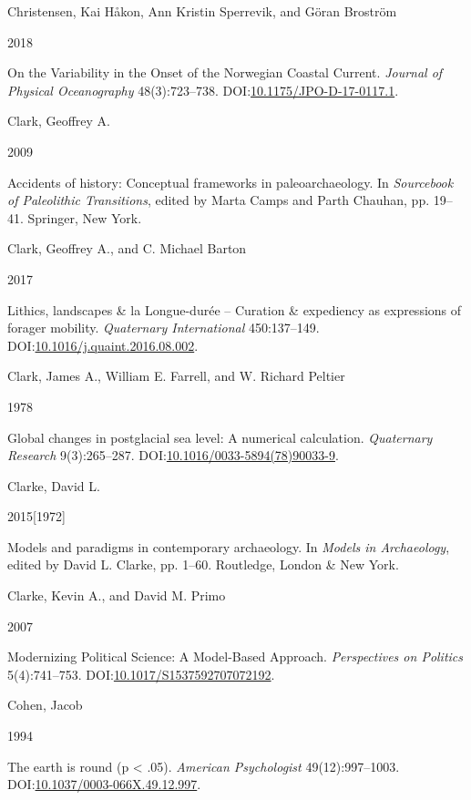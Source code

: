 \documentclass[
  12pt,
  a4paper,
  oneside]{book}
\newlength{\cslhangindent}
\newlength{\csllabelwidth}
\newlength{\cslentryspacingunit} %
\newenvironment{CSLReferences}[2] %
 {%
  \setlength{\parindent}{0pt}
  \ifodd #1
  \let\oldpar\par
  \def\par{\hangindent=\cslhangindent\oldpar}
  \fi
  \setlength{\parskip}{#2\cslentryspacingunit}
 }%
 {}
\newcommand{\CSLBlock}[1]{#1\hfill\break}
\newcommand{\CSLLeftMargin}[1]{\parbox[t]{\csllabelwidth}{#1}}
\newcommand{\CSLRightInline}[1]{\parbox[t]{\linewidth - \csllabelwidth}{#1}\break}
\begin{document}
\begin{CSLReferences}{0}{0}
\leavevmode{}%
\CSLBlock{Christensen, Kai Håkon, Ann Kristin Sperrevik, and Göran Broström}
\CSLLeftMargin{ 2018}
\CSLRightInline{{On the Variability in the Onset of the Norwegian Coastal Current}. \emph{Journal of Physical Oceanography} 48(3):723--738. DOI:\href{https://doi.org/10.1175/JPO-D-17-0117.1}{10.1175/JPO-D-17-0117.1}.}

\leavevmode{}%
\CSLBlock{Clark, Geoffrey A.}
\CSLLeftMargin{ 2009}
\CSLRightInline{Accidents of history: Conceptual frameworks in paleoarchaeology. In \emph{{Sourcebook of Paleolithic Transitions}}, edited by Marta Camps and Parth Chauhan, pp. 19--41. Springer, New York.}

\leavevmode{}%
\CSLBlock{Clark, Geoffrey A., and C. Michael Barton}
\CSLLeftMargin{ 2017}
\CSLRightInline{Lithics, landscapes \& la Longue-durée -- Curation \& expediency as expressions of forager mobility. \emph{Quaternary International} 450:137--149. DOI:\href{https://doi.org/10.1016/j.quaint.2016.08.002}{10.1016/j.quaint.2016.08.002}.}

\leavevmode{}%
\CSLBlock{Clark, James A., William E. Farrell, and W. Richard Peltier}
\CSLLeftMargin{ 1978}
\CSLRightInline{{Global changes in postglacial sea level: A numerical calculation}. \emph{Quaternary Research} 9(3):265--287. DOI:\href{https://doi.org/10.1016/0033-5894(78)90033-9}{10.1016/0033-5894(78)90033-9}.}

\leavevmode{}%
\CSLBlock{Clarke, David L.}
\CSLLeftMargin{ 2015{[}1972{]}}
\CSLRightInline{{Models and paradigms in contemporary archaeology}. In \emph{{Models in Archaeology}}, edited by David L. Clarke, pp. 1--60. Routledge, London \& New York.}

\leavevmode{}%
\CSLBlock{Clarke, Kevin A., and David M. Primo}
\CSLLeftMargin{ 2007}
\CSLRightInline{{Modernizing Political Science: A Model-Based Approach}. \emph{Perspectives on Politics} 5(4):741--753. DOI:\href{https://doi.org/10.1017/S1537592707072192}{10.1017/S1537592707072192}.}

\leavevmode{}%
\CSLBlock{Cohen, Jacob}
\CSLLeftMargin{ 1994}
\CSLRightInline{{The earth is round (p \textless{} .05)}. \emph{American Psychologist} 49(12):997--1003. DOI:\href{https://doi.org/10.1037/0003-066X.49.12.997}{10.1037/0003-066X.49.12.997}.}


\end{CSLReferences}
\end{document}
